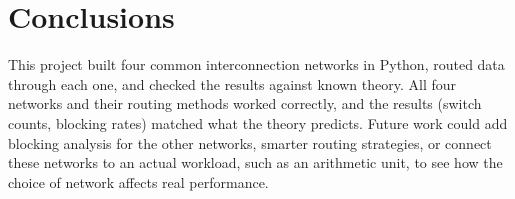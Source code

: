 \documentclass[11pt]{article}
\begin{document}
\section{Conclusions}
This project built four common interconnection networks in Python,
routed data through each one, and checked the results against
known theory. All four networks and their routing methods worked
correctly, and the results (switch counts, blocking rates) matched
what the theory predicts. Future work could add blocking analysis
for the other networks, smarter routing strategies, or connect
these networks to an actual workload, such as an arithmetic unit,
to see how the choice of network affects real performance.



\end{document}
